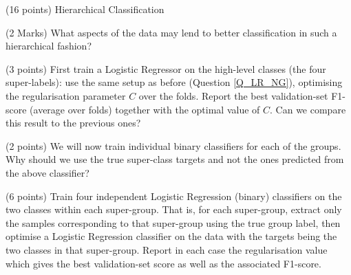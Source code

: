 \documentclass[12pt]{article}
\begin{document}



\begin{question}{(16 points) Hierarchical Classification}




\begin{subquestion}{(2 Marks) What aspects of the data may lend to better classification in such a hierarchical fashion?}






\end{subquestion}

\begin{subquestion}{(3 points) First train a Logistic Regressor on the high-level classes (\ie the four super-labels): use the same setup as before (Question \ref{Q_LR_NG}), optimising the regularisation parameter $C$ over the folds. Report the best validation-set F1-score (average over folds) together with the optimal value of $C$. } Can we compare this result to the previous ones?






\end{subquestion}

\begin{subquestion}{(2 points) We will now train individual binary classifiers for each of the groups. Why should we use the true super-class targets and not the ones predicted from the above classifier?}






\end{subquestion}

\begin{subquestion}{(6 points) Train four independent Logistic Regression (binary) classifiers on the two classes within each super-group. That is, for each super-group, extract only the samples corresponding to that super-group using the true group label, then optimise a Logistic Regression classifier on the data with the targets being the two classes in that super-group. Report in each case the regularisation value which gives the best validation-set score as well as the associated F1-score. }




\end{subquestion}
\end{question}
\end{document}
